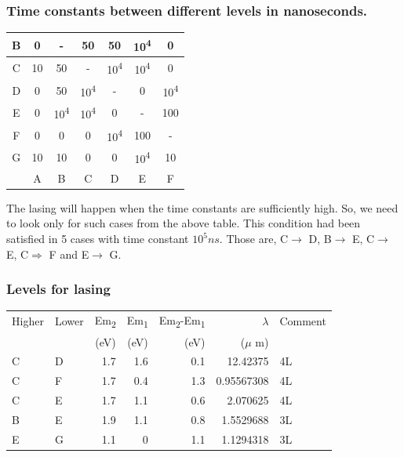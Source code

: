 \documentclass[a4paper,11pt]{article}
\begin{document}
\subsubsection*{Time constants between different levels in nanoseconds.}
\label{sec:org6a42781}
\begin{center}
\begin{tabular}{|c|c|c|c|c|c|c|}
\hline
B & 0 & - & 50 & 50 & 10\textsuperscript{4} & 0\\
\hline
C & 10 & 50 & - & 10\textsuperscript{4} & 10\textsuperscript{4} & 0\\
\hline
D & 0 & 50 & 10\textsuperscript{4} & - & 0 & 10\textsuperscript{4}\\
\hline
E & 0 & 10\textsuperscript{4} & 10\textsuperscript{4} & 0 & - & 100\\
\hline
F & 0 & 0 & 0 & 10\textsuperscript{4} & 100 & -\\
\hline
G & 10 & 10 & 0 & 0 & 10\textsuperscript{4} & 10\\
\hline
 & A & B & C & D & E & F\\
\hline
\end{tabular}
\end{center}

The lasing will happen when the time constants are sufficiently high. So, we need to look only for such cases from the above table. This condition had been satisfied in 5 cases with time constant \(10^{5} ns\). Those are,  C\(\rightarrow\) D, B\(\rightarrow\) E, C\(\rightarrow\) E, C\(\Rightarrow\) F and E\(\rightarrow\) G.

\subsubsection*{Levels for lasing}
\label{sec:org7c8f010}

\begin{center}
\begin{tabular}{llrrrrl}
\hline
Higher & Lower & Em\textsubscript{2} & Em\textsubscript{1} & Em\textsubscript{2}-Em\textsubscript{1} & \(\lambda\) & Comment\\
 &  & (eV) & (eV) & (eV) & (\(\mu\) m) & \\
\hline
C & D & 1.7 & 1.6 & 0.1 & 12.42375 & 4L\\
C & F & 1.7 & 0.4 & 1.3 & 0.95567308 & 4L\\
C & E & 1.7 & 1.1 & 0.6 & 2.070625 & 4L\\
B & E & 1.9 & 1.1 & 0.8 & 1.5529688 & 3L\\
E & G & 1.1 & 0 & 1.1 & 1.1294318 & 3L\\
\hline
\end{tabular}
\end{center}
\end{document}
